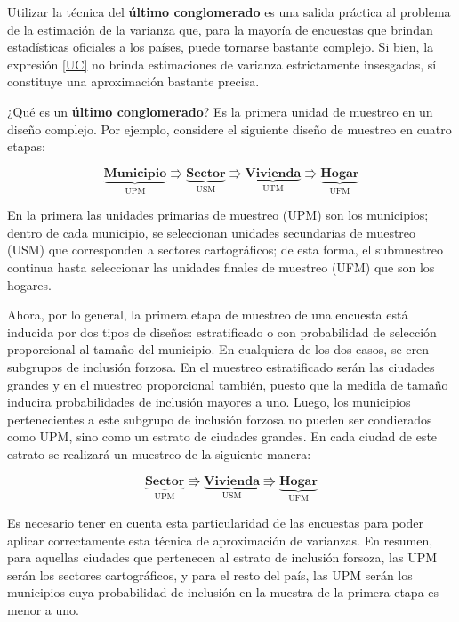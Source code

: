\documentclass[
  12pt,
  spanish,
]{book}
\begin{document}
Utilizar la técnica del \textbf{último conglomerado} es una salida práctica al problema de la estimación de la varianza que, para la mayoría de encuestas que brindan estadísticas oficiales a los países, puede tornarse bastante complejo. Si bien, la expresión \eqref{UC} no brinda estimaciones de varianza estrictamente insesgadas, sí constituye una aproximación bastante precisa.

¿Qué es un \textbf{último conglomerado}? Es la primera unidad de muestreo en un diseño complejo. Por ejemplo, considere el siguiente diseño de muestreo en cuatro etapas:

\begin{equation*}
\underbrace{\textbf{Municipio}}_{\text{UPM}} \Rrightarrow
\underbrace{\textbf{Sector}}_{\text{USM}} \Rrightarrow
\underbrace{\textbf{Vivienda}}_{\text{UTM}} \Rrightarrow
\underbrace{\textbf{Hogar}}_{\text{UFM}}
\end{equation*}

En la primera las unidades primarias de muestreo (UPM) son los municipios; dentro de cada municipio, se seleccionan unidades secundarias de muestreo (USM) que corresponden a sectores cartográficos; de esta forma, el submuestreo continua hasta seleccionar las unidades finales de muestreo (UFM) que son los hogares.

Ahora, por lo general, la primera etapa de muestreo de una encuesta está inducida por dos tipos de diseños: estratificado o con probabilidad de selección proporcional al tamaño del municipio. En cualquiera de los dos casos, se cren subgrupos de inclusión forzosa. En el muestreo estratificado serán las ciudades grandes y en el muestreo proporcional también, puesto que la medida de tamaño inducira probabilidades de inclusión mayores a uno.
Luego, los municipios pertenecientes a este subgrupo de inclusión forzosa no pueden ser condierados como UPM, sino como un estrato de ciudades grandes. En cada ciudad de este estrato se realizará un muestreo de la siguiente manera:

\begin{equation*}
\underbrace{\textbf{Sector}}_{\text{UPM}} \Rrightarrow
\underbrace{\textbf{Vivienda}}_{\text{USM}} \Rrightarrow
\underbrace{\textbf{Hogar}}_{\text{UFM}}
\end{equation*}

Es necesario tener en cuenta esta particularidad de las encuestas para poder aplicar correctamente esta técnica de aproximación de varianzas. En resumen, para aquellas ciudades que pertenecen al estrato de inclusión forsoza, las UPM serán los sectores cartográficos, y para el resto del país, las UPM serán los municipios cuya probabilidad de inclusión en la muestra de la primera etapa es menor a uno.
\end{document}

